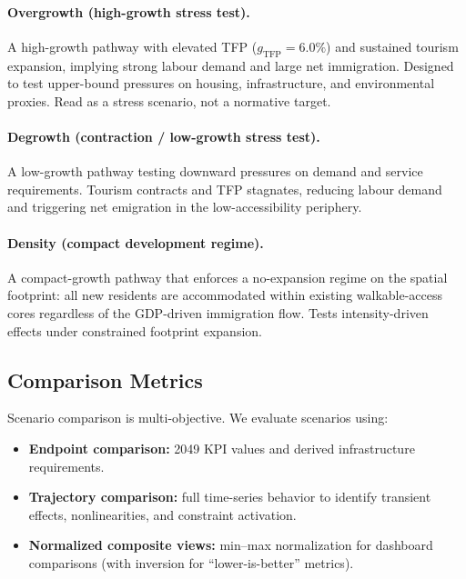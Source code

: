 \documentclass{article}
\begin{document}
\paragraph{Overgrowth (high-growth stress test).}
A high-growth pathway with elevated TFP ($g_\text{TFP}=6.0\%$) and sustained
tourism expansion, implying strong labour demand and large net immigration.
Designed to test upper-bound pressures on housing, infrastructure, and
environmental proxies. Read as a stress scenario, not a normative target.

\paragraph{Degrowth (contraction / low-growth stress test).}
A low-growth pathway testing downward pressures on demand and service
requirements. Tourism contracts and TFP stagnates, reducing labour demand and
triggering net emigration in the low-accessibility periphery.

\paragraph{Density (compact development regime).}
A compact-growth pathway that enforces a no-expansion regime on the spatial
footprint: all new residents are accommodated within existing walkable-access
cores regardless of the GDP-driven immigration flow. Tests intensity-driven
effects under constrained footprint expansion.

\subsection{Comparison Metrics}
\label{subsec:exp_metrics}

Scenario comparison is multi-objective. We evaluate scenarios using:
\begin{itemize}
    \item \textbf{Endpoint comparison:} 2049 KPI values and derived
          infrastructure requirements.
    \item \textbf{Trajectory comparison:} full time-series behavior to identify
          transient effects, nonlinearities, and constraint activation.
    \item \textbf{Normalized composite views:} min--max normalization for
          dashboard comparisons (with inversion for ``lower-is-better'' metrics).
\end{itemize}

\end{document}
